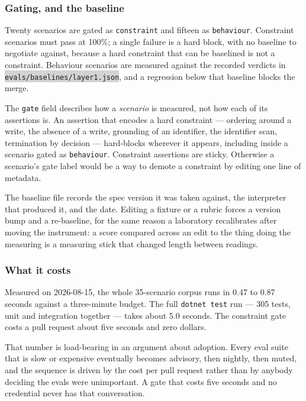 \documentclass[11pt,a4paper]{article}
\newcommand{\repopath}[1]{\colorbox{lightgray}{\texttt{#1}}}
\begin{document}
\subsubsection*{Gating, and the baseline}

Twenty scenarios are gated as \texttt{constraint} and fifteen as \texttt{behaviour}. Constraint scenarios must pass at 100\%; a single failure is a hard block, with no baseline to negotiate against, because a hard constraint that can be baselined is not a constraint. Behaviour scenarios are measured against the recorded verdicts in \repopath{evals/baselines/layer1.json}, and a regression below that baseline blocks the merge.

The \texttt{gate} field describes how a \emph{scenario} is measured, not how each of its assertions is. An assertion that encodes a hard constraint --- ordering around a write, the absence of a write, grounding of an identifier, the identifier scan, termination by decision --- hard-blocks wherever it appears, including inside a scenario gated as \texttt{behaviour}. Constraint assertions are sticky. Otherwise a scenario's gate label would be a way to demote a constraint by editing one line of metadata.

The baseline file records the spec version it was taken against, the interpreter that produced it, and the date. Editing a fixture or a rubric forces a version bump and a re-baseline, for the same reason a laboratory recalibrates after moving the instrument: a score compared across an edit to the thing doing the measuring is a measuring stick that changed length between readings.

\subsubsection*{What it costs}

Measured on 2026-08-15, the whole 35-scenario corpus runs in 0.47 to 0.87 seconds against a three-minute budget. The full \texttt{dotnet test} run --- 305 tests, unit and integration together --- takes about 5.0 seconds. The constraint gate costs a pull request about five seconds and zero dollars.

That number is load-bearing in an argument about adoption. Every eval suite that is slow or expensive eventually becomes advisory, then nightly, then muted, and the sequence is driven by the cost per pull request rather than by anybody deciding the evals were unimportant. A gate that costs five seconds and no credential never has that conversation.
\end{document}
